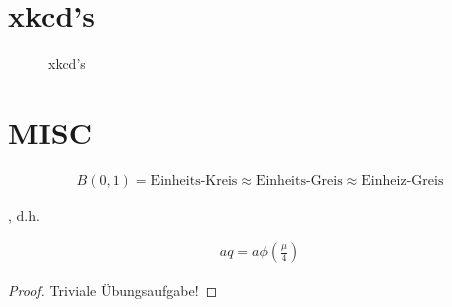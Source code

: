 \documentclass{article}
\begin{document}
\section{xkcd's}

\begin{figure}[H]
  \centering
  \hspace{0mm}
  \caption{xkcd's}
  \label{fig:xkcd}
\end{figure}

\section{MISC}

\begin{theorem}
  
  \begin{align*}
    B(0, 1)
    =
    \text{Einheits-Kreis}
    \approx
    \text{Einheits-Greis}
    \approx
    \text{Einheiz-Greis}
  \end{align*}

\end{theorem}

\begin{theorem}
  
  , d.h.

  \begin{align}
    aq = a \phi \left( \frac{\mu}{4} \right)
  \end{align}

\end{theorem}

\begin{proof}
  Triviale Übungsaufgabe!
\end{proof}
\end{document}
